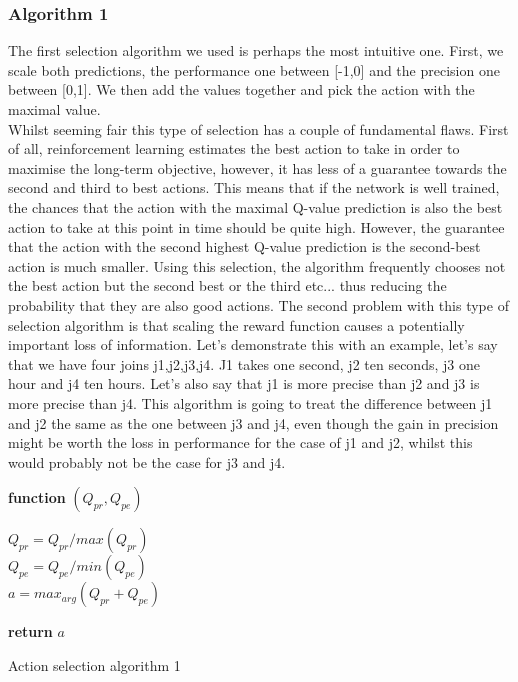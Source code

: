 \subsubsection{Algorithm 1}
The first selection algorithm we used is perhaps the most intuitive one. First, we scale both predictions, the performance one between [-1,0] and the precision one between [0,1]. We then add the values together and pick the action with the maximal value.\\
Whilst seeming fair this type of selection has a couple of fundamental flaws. First of all, reinforcement learning estimates the best action to take in order to maximise the long-term objective, however, it has less of a guarantee towards the second and third to best actions. This means that if the network is well trained, the chances that the action with the maximal Q-value prediction is also the best action to take at this point in time should be quite high. However, the guarantee that the action with the second highest Q-value prediction is the second-best action is much smaller. Using this selection, the algorithm frequently chooses not the best action but the second best or the third etc... thus reducing the probability that they are also good actions. The second problem with this type of selection algorithm is that scaling the reward function causes a potentially important loss of information. Let's demonstrate this with an example, let's say that we have four joins j1,j2,j3,j4. J1 takes one second, j2 ten seconds, j3 one hour and j4 ten hours. Let's also say that j1 is more precise than j2 and j3 is more precise than j4. This algorithm is going to treat the difference between j1 and j2 the same as the one between j3 and j4, even though the gain in precision might be worth the loss in performance for the case of j1 and j2, whilst this would probably not be the case for j3 and j4.
\begin{center}
\begin{algorithm}[H]

    \textbf{function}  $(Q_{pr},Q_{pe})$\;
    
    
    \Indp{}\Indm
    \Indp{} \Indm
    \Indp
    $Q_{pr} = Q_{pr}/max(Q_{pr})$\\
    $Q_{pe} = Q_{pe}/min(Q_{pe})$\\
    $a = max_{arg}(Q_{pr}+Q_{pe})$
    
  
   \textbf{return} $a$

\caption{Action selection algorithm 1}
\end{algorithm}
\end{center}
